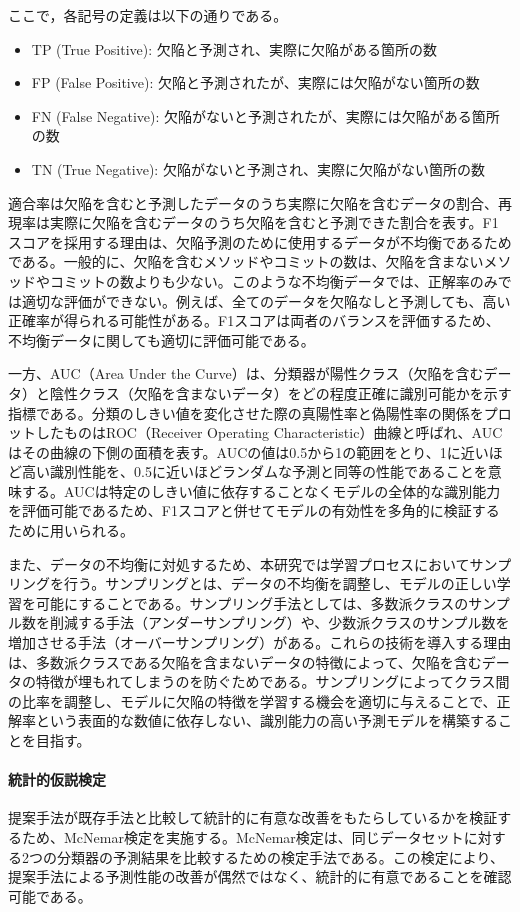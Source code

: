 ここで，各記号の定義は以下の通りである。
\begin{itemize}
  \item TP (True Positive): 欠陥と予測され、実際に欠陥がある箇所の数
  \item FP (False Positive): 欠陥と予測されたが、実際には欠陥がない箇所の数
  \item FN (False Negative): 欠陥がないと予測されたが、実際には欠陥がある箇所の数
  \item TN (True Negative): 欠陥がないと予測され、実際に欠陥がない箇所の数
\end{itemize}

適合率は欠陥を含むと予測したデータのうち実際に欠陥を含むデータの割合、再現率は実際に欠陥を含むデータのうち欠陥を含むと予測できた割合を表す。F1スコアを採用する理由は、欠陥予測のために使用するデータが不均衡であるためである。一般的に、欠陥を含むメソッドやコミットの数は、欠陥を含まないメソッドやコミットの数よりも少ない。このような不均衡データでは、正解率のみでは適切な評価ができない。例えば、全てのデータを欠陥なしと予測しても、高い正確率が得られる可能性がある。F1スコアは両者のバランスを評価するため、不均衡データに関しても適切に評価可能である。

一方、AUC（Area Under the Curve）は、分類器が陽性クラス（欠陥を含むデータ）と陰性クラス（欠陥を含まないデータ）をどの程度正確に識別可能かを示す指標である。分類のしきい値を変化させた際の真陽性率と偽陽性率の関係をプロットしたものはROC（Receiver Operating Characteristic）曲線と呼ばれ、AUCはその曲線の下側の面積を表す。AUCの値は0.5から1の範囲をとり、1に近いほど高い識別性能を、0.5に近いほどランダムな予測と同等の性能であることを意味する。AUCは特定のしきい値に依存することなくモデルの全体的な識別能力を評価可能であるため、F1スコアと併せてモデルの有効性を多角的に検証するために用いられる。

また、データの不均衡に対処するため、本研究では学習プロセスにおいてサンプリングを行う。サンプリングとは、データの不均衡を調整し、モデルの正しい学習を可能にすることである。サンプリング手法としては、多数派クラスのサンプル数を削減する手法（アンダーサンプリング）や、少数派クラスのサンプル数を増加させる手法（オーバーサンプリング）がある。これらの技術を導入する理由は、多数派クラスである欠陥を含まないデータの特徴によって、欠陥を含むデータの特徴が埋もれてしまうのを防ぐためである。サンプリングによってクラス間の比率を調整し、モデルに欠陥の特徴を学習する機会を適切に与えることで、正解率という表面的な数値に依存しない、識別能力の高い予測モデルを構築することを目指す。


\paragraph{統計的仮説検定}
提案手法が既存手法と比較して統計的に有意な改善をもたらしているかを検証するため、McNemar検定を実施する。McNemar検定は、同じデータセットに対する2つの分類器の予測結果を比較するための検定手法である。この検定により、提案手法による予測性能の改善が偶然ではなく、統計的に有意であることを確認可能である。

